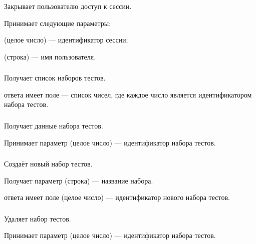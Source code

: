 Закрывает пользователю доступ к сессии.

Принимает следующие параметры:

\begin{icItems}
	\item {} (целое число) — идентификатор сессии;
	\item {} (строка) — имя пользователя.
\end{icItems}

\subsubsection{}

Получает список наборов тестов.

 ответа имеет поле  — список чисел, где каждое число является идентификатором набора тестов.

\subsubsection{}

Получает данные набора тестов. 

Принимает параметр  (целое число) — идентификатор набора тестов.

\subsubsection{}

Создаёт новый набор тестов.

Получает параметр  (строка) — название набора.

 ответа имеет поле  (целое число) — идентификатор нового набора тестов.

\subsubsection{}

Удаляет набор тестов.

Принимает параметр  (целое число) — идентификатор набора тестов.

\subsubsection{}

